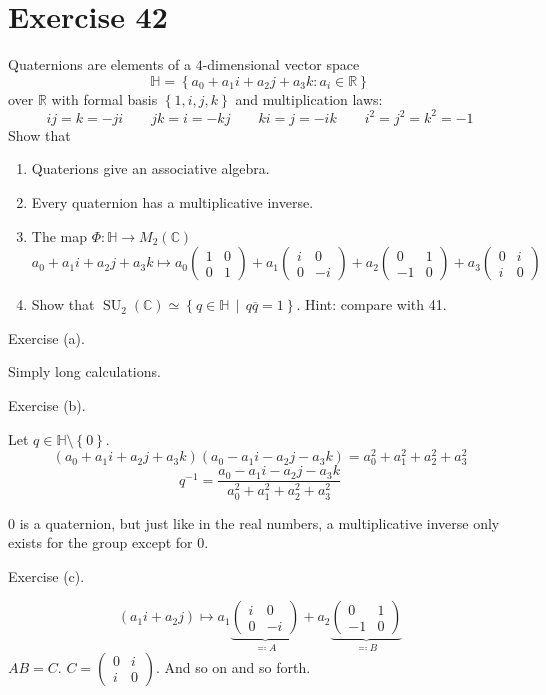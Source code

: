 \documentclass[a4paper]{article}
\theoremstyle{definition}
\newcommand\set[1]{\left\{#1\right\}}
\newcommand\setdef[2]{\left\{#1\,\middle|\,#2\right\}}
\begin{document}
\section{Exercise 42}
\begin{ex}
  Quaternions are elements of a $4$-dimensional vector space
  \[ \mathbb H = \set{a_0 + a_1 i + a_2 j + a_3 k: a_i \in \mathbb R} \]
  over $\mathbb R$ with formal basis $\set{1,i,j,k}$ and multiplication laws:
  \[ ij = k = -ji \qquad jk = i = -kj \qquad ki = j =-ik \qquad i^2 = j^2 = k^2 = -1 \]
  Show that
  \begin{enumerate}
    \item Quaterions give an associative algebra.
    \item Every quaternion has a multiplicative inverse.
    \item The map $\Phi: \mathbb H \to M_2(\mathbb C)$
      \[ a_0 + a_1i + a_2j + a_3k \mapsto a_0 \begin{pmatrix} 1 & 0 \\ 0 & 1 \end{pmatrix} + a_1 \begin{pmatrix} i & 0 \\ 0 & -i \end{pmatrix} + a_2 \begin{pmatrix} 0 & 1 \\ -1 & 0 \end{pmatrix} + a_3 \begin{pmatrix} 0 & i \\ i & 0 \end{pmatrix} \]
    \item Show that $\operatorname{SU}_2(\mathbb C) \simeq \setdef{q \in \mathbb H}{q\overline q = 1}$. Hint: compare with 41.
  \end{enumerate}
\end{ex}

Exercise (a).

Simply long calculations.

Exercise (b).

Let $q \in \mathbb H \setminus \set{0}$.
\[ (a_0 + a_1 i + a_2 j + a_3 k)(a_0 - a_1 i - a_2 j - a_3 k) = a_0^2 + a_1^2 + a_2^2 + a_3^2 \]
\[ q^{-1} = \frac{a_0 - a_1 i - a_2 j - a_3 k}{a_0^2 + a_1^2 + a_2^2 + a_3^2} \]

$0$ is a quaternion, but just like in the real numbers, a multiplicative inverse only exists for the group except for $0$.

Exercise (c).

\[ (a_1 i + a_2 j) \mapsto a_1 \underbrace{\begin{pmatrix} i & 0 \\ 0 & -i \end{pmatrix}}_{\eqqcolon A} + a_2 \underbrace{\begin{pmatrix} 0 & 1 \\ -1 & 0 \end{pmatrix}}_{\eqqcolon B} \]
$AB = C$. $C = \begin{pmatrix} 0 & i \\ i & 0 \end{pmatrix}$. And so on and so forth.
\end{document}
